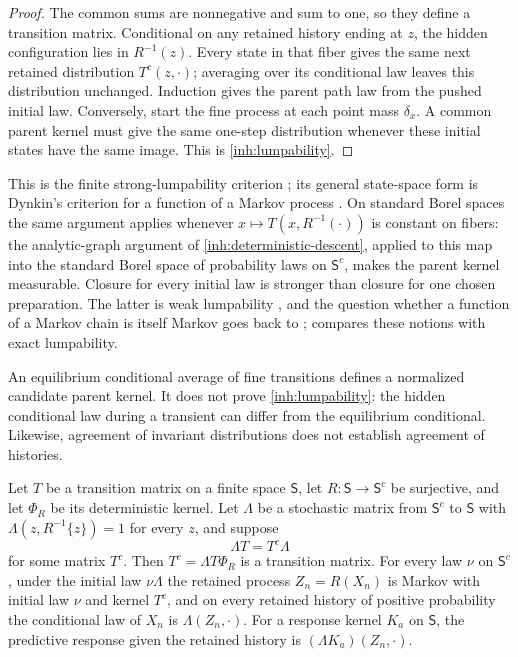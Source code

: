 \begin{proof}
The common sums are nonnegative and sum to one, so they define a transition
matrix. Conditional on any retained history ending at $z$, the hidden
configuration lies in $R^{-1}(z)$. Every state in that fiber gives the same
next retained distribution $T^c(z,\cdot)$; averaging over its conditional
law leaves this distribution unchanged. Induction gives the parent path law
from the pushed initial law. Conversely, start the fine process at each
point mass $\delta_x$. A common parent kernel must give the same one-step
distribution whenever these initial states have the same image. This is
\cref{inh:lumpability}.
\end{proof}

This is the finite strong-lumpability criterion
\citep{KemenySnell1976}; its general state-space form is Dynkin's criterion
for a function of a Markov process \citep{Dynkin1965}. On standard Borel
spaces the same argument applies whenever $x\mapsto T(x,R^{-1}(\cdot))$ is
constant on fibers: the analytic-graph argument of
\cref{inh:deterministic-descent}, applied to this map into the standard Borel
space of probability laws on $\mathsf S^c$, makes the parent kernel
measurable. Closure for every initial law is stronger than closure for one
chosen preparation. The latter is weak lumpability \citep{KemenySnell1976},
and the question whether a function of a Markov chain is itself Markov goes
back to \citet{BurkeRosenblatt1958}; \citet{Buchholz1994} compares these
notions with exact lumpability.

An equilibrium conditional average of fine transitions defines a normalized
candidate parent kernel. It does not prove \cref{inh:lumpability}: the
hidden conditional law during a transient can differ from the equilibrium
conditional. Likewise, agreement of invariant distributions does not
establish agreement of histories.

Let $T$ be a transition matrix on a finite space $\mathsf S$, let
$R:\mathsf S\to\mathsf S^c$ be surjective, and let $\Phi_R$ be its
deterministic kernel. Let $\Lambda$ be a stochastic matrix from
$\mathsf S^c$ to $\mathsf S$ with $\Lambda(z,R^{-1}\{z\})=1$ for every $z$,
and suppose
\begin{equation}
 \Lambda T=T^c\Lambda
 \label{inh:intertwining-identity}
\end{equation}
for some matrix $T^c$. Then $T^c=\Lambda T\Phi_R$ is a transition matrix.
For every law $\nu$ on $\mathsf S^c$, under the initial law $\nu\Lambda$ the
retained process $Z_n=R(X_n)$ is Markov with initial law $\nu$ and kernel
$T^c$, and on every retained history of positive probability the conditional
law of $X_n$ is $\Lambda(Z_n,\cdot)$. For a response kernel $K_a$ on
$\mathsf S$, the predictive response given the retained history is
$(\Lambda K_a)(Z_n,\cdot)$.


